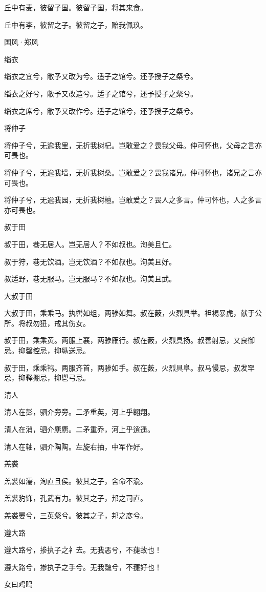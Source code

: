 丘中有麦，彼留子国。彼留子国，将其来食。

丘中有李，彼留之子。彼留之子，贻我佩玖。




国风·郑风


缁衣

缁衣之宜兮，敝予又改为兮。适子之馆兮。还予授子之粲兮。

缁衣之好兮，敝予又改造兮。适子之馆兮，还予授子之粲兮。

缁衣之席兮，敝予又改作兮。适子之馆兮，还予授子之粲兮。

将仲子

将仲子兮，无逾我里，无折我树杞。岂敢爱之？畏我父母。仲可怀也，父母之言亦可畏也。

将仲子兮，无逾我墙，无折我树桑。岂敢爱之？畏我诸兄。仲可怀也，诸兄之言亦可畏也。

将仲子兮，无逾我园，无折我树檀。岂敢爱之？畏人之多言。仲可怀也，人之多言亦可畏也。

叔于田

叔于田，巷无居人。岂无居人？不如叔也。洵美且仁。

叔于狩，巷无饮酒。岂无饮酒？不如叔也。洵美且好。

叔适野，巷无服马。岂无服马？不如叔也。洵美且武。

大叔于田

大叔于田，乘乘马。执辔如组，两骖如舞。叔在薮，火烈具举。袒裼暴虎，献于公所。将叔勿狃，戒其伤女。

叔于田，乘乘黄。两服上襄，两骖雁行。叔在薮，火烈具扬。叔善射忌，又良御忌。抑罄控忌，抑纵送忌。

叔于田，乘乘鸨。两服齐首，两骖如手。叔在薮，火烈具阜。叔马慢忌，叔发罕忌，抑释掤忌，抑鬯弓忌。

清人

清人在彭，驷介旁旁。二矛重英，河上乎翱翔。

清人在消，驷介麃麃。二矛重乔，河上乎逍遥。

清人在轴，驷介陶陶。左旋右抽，中军作好。

羔裘

羔裘如濡，洵直且侯。彼其之子，舍命不渝。

羔裘豹饰，孔武有力。彼其之子，邦之司直。

羔裘晏兮，三英粲兮。彼其之子，邦之彦兮。

遵大路

遵大路兮，掺执子之衤去。无我恶兮，不蓵故也！

遵大路兮，掺执子之手兮。无我魗兮，不蓵好也！

女曰鸡鸣

